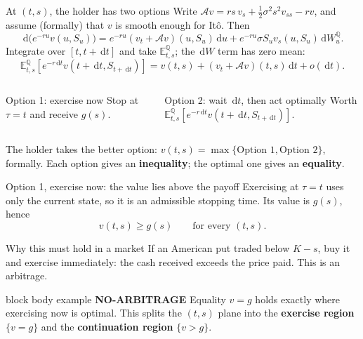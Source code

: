 \documentclass[handout,10pt,aspectratio=169]{beamer}
\newenvironment{marketbox}{\begin{beamercolorbox}[rounded=true,sep=0.7em,wd=\textwidth]{block body example}
  \textbf{\color{CourseGreen}NO-ARBITRAGE}\quad}{\end{beamercolorbox}}
\newcommand{\E}{\mathbb E}
\newcommand{\Q}{\mathbb Q}
\newcommand{\dd}{\,\mathrm d}
\begin{document}
\begin{frame}{At \((t,s)\), the holder has two options}
\small
Write \(\mathcal Av=rs\,v_s+\tfrac12\sigma^2s^2v_{ss}-rv\), and assume
(formally) that \(v\) is smooth enough for It\^o. Then
\[
\dd\bigl(e^{-ru}v(u,S_u)\bigr)
=e^{-ru}(v_t+\mathcal Av)(u,S_u)\dd u+e^{-ru}\sigma S_uv_s(u,S_u)\dd W_u^\Q .
\]
Integrate over \([t,t+\dd t]\) and take \(\E^\Q_{t,s}\); the \(\dd W\) term has
zero mean:
\[
\E^\Q_{t,s}\!\left[e^{-r\dd t}v(t+\dd t,S_{t+\dd t})\right]
=v(t,s)+(v_t+\mathcal Av)(t,s)\dd t+o(\dd t).
\]
\begin{columns}[T,onlytextwidth]
\begin{block}{Option 1: exercise now}
Stop at \(\tau=t\) and receive \(g(s)\).
\end{block}
\begin{exampleblock}{Option 2: wait \(\dd t\), then act optimally}
Worth \(\E^\Q_{t,s}\!\left[e^{-r\dd t}v(t+\dd t,S_{t+\dd t})\right]\).
\end{exampleblock}
\end{columns}
\medskip
The holder takes the better option:
\(v(t,s)=\max\{\text{Option 1},\text{Option 2}\}\), formally.
Each option gives an \textbf{inequality}; the optimal one gives an
\textbf{equality}.
\end{frame}

\begin{frame}{Option 1, exercise now: the value lies above the payoff}
Exercising at \(\tau=t\) uses only the current state, so it is an admissible
stopping time. Its value is \(g(s)\), hence
\[
\boxed{v(t,s)\geq g(s)\qquad\text{for every }(t,s).}
\]
\begin{block}{Why this must hold in a market}
If an American put traded below \(K-s\), buy it and exercise immediately:
the cash received exceeds the price paid. This is an arbitrage.
\end{block}
\begin{marketbox}
Equality \(v=g\) holds exactly where exercising now is optimal. This splits
the \((t,s)\) plane into the \textbf{exercise region} \(\{v=g\}\) and the
\textbf{continuation region} \(\{v>g\}\).
\end{marketbox}
\end{frame}
\end{document}
